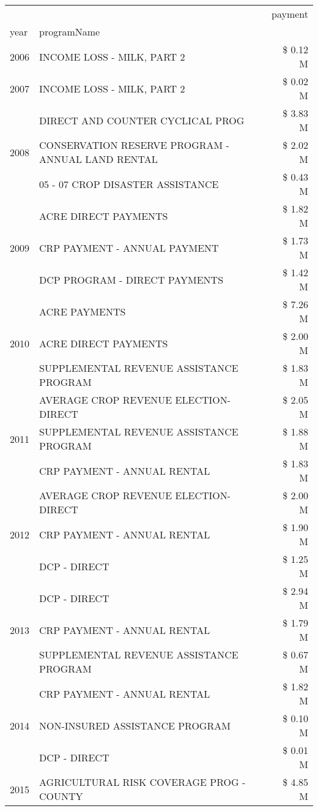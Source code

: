\begin{tabular}{llr}
\toprule
 &  & payment \\
year & programName &  \\
\midrule
2006 & INCOME LOSS - MILK, PART 2 & \$ 0.12 M \\
\cline{1-3}
2007 & INCOME LOSS - MILK, PART 2 & \$ 0.02 M \\
\cline{1-3}
\multirow[t]{3}{*}{2008} & DIRECT AND COUNTER CYCLICAL PROG & \$ 3.83 M \\
 & CONSERVATION RESERVE PROGRAM - ANNUAL LAND RENTAL & \$ 2.02 M \\
 & 05 - 07 CROP DISASTER ASSISTANCE & \$ 0.43 M \\
\cline{1-3}
\multirow[t]{3}{*}{2009} & ACRE DIRECT PAYMENTS & \$ 1.82 M \\
 & CRP PAYMENT - ANNUAL PAYMENT & \$ 1.73 M \\
 & DCP PROGRAM - DIRECT PAYMENTS & \$ 1.42 M \\
\cline{1-3}
\multirow[t]{3}{*}{2010} & ACRE PAYMENTS & \$ 7.26 M \\
 & ACRE DIRECT PAYMENTS & \$ 2.00 M \\
 & SUPPLEMENTAL REVENUE ASSISTANCE PROGRAM & \$ 1.83 M \\
\cline{1-3}
\multirow[t]{3}{*}{2011} & AVERAGE CROP REVENUE ELECTION-DIRECT & \$ 2.05 M \\
 & SUPPLEMENTAL REVENUE ASSISTANCE PROGRAM & \$ 1.88 M \\
 & CRP PAYMENT - ANNUAL RENTAL & \$ 1.83 M \\
\cline{1-3}
\multirow[t]{3}{*}{2012} & AVERAGE CROP REVENUE ELECTION-DIRECT & \$ 2.00 M \\
 & CRP PAYMENT - ANNUAL RENTAL & \$ 1.90 M \\
 & DCP - DIRECT & \$ 1.25 M \\
\cline{1-3}
\multirow[t]{3}{*}{2013} & DCP - DIRECT & \$ 2.94 M \\
 & CRP PAYMENT - ANNUAL RENTAL & \$ 1.79 M \\
 & SUPPLEMENTAL REVENUE ASSISTANCE PROGRAM & \$ 0.67 M \\
\cline{1-3}
\multirow[t]{3}{*}{2014} & CRP PAYMENT - ANNUAL RENTAL & \$ 1.82 M \\
 & NON-INSURED ASSISTANCE PROGRAM & \$ 0.10 M \\
 & DCP - DIRECT & \$ 0.01 M \\
\cline{1-3}
\multirow[t]{3}{*}{2015} & AGRICULTURAL RISK COVERAGE PROG - COUNTY & \$ 4.85 M \\

\end{tabular}
